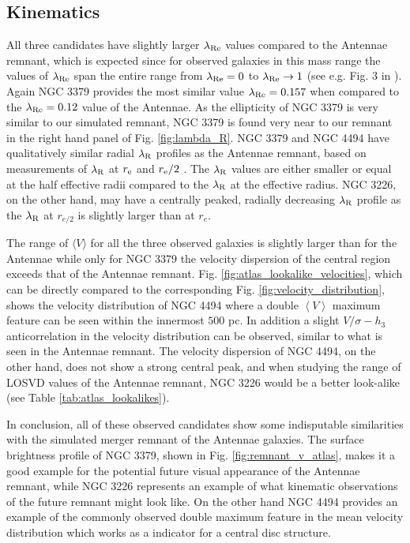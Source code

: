 \documentclass[a4paper,fleqn,usenatbib]{mnras}
\begin{document}
\subsection{Kinematics}

All three candidates have slightly larger $\lambda_{\rm{Re}}$ values compared to the Antennae remnant, which is expected
since for observed galaxies in this mass range the values of $\lambda_{\rm{Re}}$ span the entire range
from $\lambda_{\rm{Re}}=0$ to $\lambda_{\rm{Re}}\rightarrow1$ (see e.g. Fig. 3 in \citealt{2011MNRAS.414..888E}).
Again NGC 3379 provides the most similar value $\lambda_{\rm{Re}}=0.157$ when compared to the $\lambda_{\rm{Re}}=0.12$ value of the Antennae. 
As the ellipticity of NGC 3379 is very similar to our simulated remnant, NGC 3379 is found very
near to our remnant in the right hand panel of Fig. \ref{fig:lambda_R}. NGC 3379 and NGC 4494 
have qualitatively similar radial $\lambda_{\rm{R}}$ profiles as the Antennae remnant, based on measurements of 
$\lambda_{\rm{R}}$ at $r_{\rm{e}}$ and $r_{\rm{e}} /2$ \citep{2011MNRAS.414..888E}. The $\lambda_{\rm{R}}$ values are either smaller or equal at 
the half effective radii compared to the $\lambda_{\rm{R}}$ at the effective radius. NGC 3226, on the
other hand, may have a centrally peaked, radially decreasing $\lambda_{\rm{R}}$ profile
as the $\lambda_{\rm{R}}$ at $r_{e/2}$ is slightly larger than at $r_{e}$.

The range of $\langle V\rangle$ for all the three observed galaxies is slightly larger than for the Antennae while only for 
NGC 3379 the velocity dispersion of the central region exceeds that of the Antennae remnant.
Fig. \ref{fig:atlas_lookalike_velocities}, which can be directly compared to the corresponding Fig. 
\ref{fig:velocity_distribution}, shows the velocity distribution of NGC 4494
where a double $\left\langle V\right\rangle$ maximum feature can be seen within the innermost
$500$ pc. In addition a slight $V/\sigma-h_3$ anticorrelation in the velocity distribution can be observed, 
similar to what is seen in the Antennae remnant. 
The velocity dispersion of NGC 4494, on the other hand, does not show a strong central peak, and when studying the range 
of LOSVD values of the Antennae remnant, NGC 3226 would be a better look-alike (see Table \ref{tab:atlas_lookalikes}).


In conclusion, all of these observed candidates show some indisputable similarities with 
the simulated merger remnant of the Antennae galaxies.
The surface brightness profile of NGC 3379, shown in Fig. \ref{fig:remnant_v_atlas}, 
makes it a good example for the potential future visual appearance of the 
Antennae remnant, while NGC 3226 represents an example of what kinematic observations
of the future remnant might look like. On the other hand NGC 4494 provides an example of the commonly observed double maximum 
feature in the mean velocity distribution which works as a indicator for a central disc structure.
\end{document}
